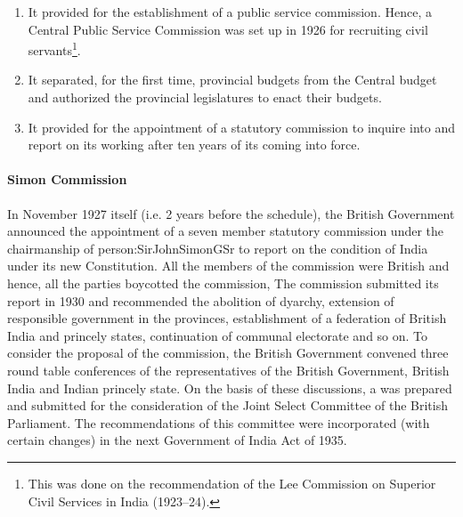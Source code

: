 \begin{enumerate}
  \item It provided for the establishment of a public service commission. Hence, a Central Public Service Commission was set up in 1926 for recruiting civil servants\footnote{This was done on the recommendation of the Lee Commission on Superior Civil Services in India (1923–24).}.
  \item It separated, for the first time, provincial budgets from the Central budget and authorized the provincial legislatures to enact their budgets.
  \item It provided for the appointment of a statutory commission to inquire into and report on its working after ten years of its coming into force.
\end{enumerate}

\paragraph{Simon Commission}

In November 1927 itself (i.e. 2 years before the schedule), the British Government announced the appointment of a seven member statutory commission under the chairmanship of \gls{person:SirJohnSimonGSr} to report on the condition of India under its new Constitution. All the members of the commission were British and hence, all the parties boycotted the commission, The commission submitted its report in 1930 and recommended the abolition of dyarchy, extension of responsible government in the provinces, establishment of a federation of British India and princely states, continuation of communal electorate and so on. To consider the proposal of the commission, the British Government convened three round table conferences of the representatives of the British Government, British India and Indian princely state. On the basis of these discussions, a  was prepared and submitted for the consideration of the Joint Select Committee of the British Parliament. The recommendations of this committee were incorporated (with certain changes) in the next Government of India Act of 1935.

